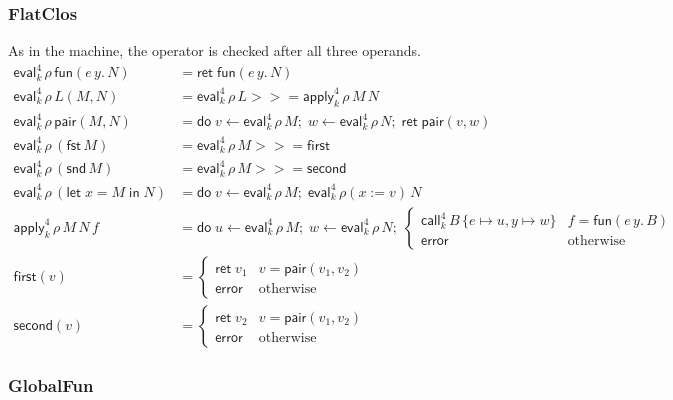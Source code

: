 \documentclass[10pt]{article}
\theoremstyle{acmplain}
\newcommand{\key}[1]{\mathsf{#1}}
\newcommand{\Let}{\key{let}\;}
\newcommand{\In}{\;\key{in}\;}
\newcommand{\fun}[1]{\key{fun}(#1)}
\newcommand{\pair}[2]{\key{pair}(#1, #2)}
\newcommand{\FST}{\key{fst}\,}
\newcommand{\SND}{\key{snd}\,}
\newcommand{\ext}[3]{#1(#2{:=}#3)}
\newcommand{\error}{\key{error}}
\newcommand{\pairV}[2]{\key{pair}(#1, #2)}
\newcommand{\funV}[1]{\key{fun}(#1)}
\newcommand{\Ret}{\key{ret}\;}
\newcommand{\bind}{\mathbin{>\!\!>\!\!=}}
\newcommand{\Do}{\key{do}\;}
\newcommand{\EV}[2]{\key{eval}^{#1}_{#2}}
\newcommand{\APP}[2]{\key{apply}^{#1}_{#2}}
\newcommand{\CALL}[2]{\key{call}^{#1}_{#2}}
\begin{document}
\subsubsection{FlatClos}

As in the machine, the operator is checked after all three operands.
\begin{align*}
  \EV{4}{k}\,\rho\,\fun{e\,y.\,N} &= \Ret \funV{e\, y.\, N} \\
  \EV{4}{k}\,\rho\,L(M, N) &= \EV{4}{k}\,\rho\,L \bind \APP{4}{k}\,\rho\,M\,N \\
  \EV{4}{k}\,\rho\,\pair{M}{N} &=
    \Do v \leftarrow \EV{4}{k}\,\rho\,M;\; w \leftarrow \EV{4}{k}\,\rho\,N;\; \Ret \pairV{v}{w} \\
  \EV{4}{k}\,\rho\,(\FST M) &= \EV{4}{k}\,\rho\,M \bind \key{first} \\
  \EV{4}{k}\,\rho\,(\SND M) &= \EV{4}{k}\,\rho\,M \bind \key{second} \\
  \EV{4}{k}\,\rho\,(\Let x = M \In N) &=
    \Do v \leftarrow \EV{4}{k}\,\rho\,M;\; \EV{4}{k}\,\ext{\rho}{x}{v}\,N \\[1ex]
  \APP{4}{k}\,\rho\,M\,N\,f &=
    \Do u \leftarrow \EV{4}{k}\,\rho\,M;\; w \leftarrow \EV{4}{k}\,\rho\,N;\;
    \begin{cases}
      \CALL{4}{k}\,B\,\{e {\mapsto} u, y {\mapsto} w\} & f = \funV{e\, y.\, B} \\
      \error & \text{otherwise}
    \end{cases} \\
  \key{first}(v) &=
    \begin{cases} \Ret v_1 & v = \pairV{v_1}{v_2} \\ \error & \text{otherwise} \end{cases} \\
  \key{second}(v) &=
    \begin{cases} \Ret v_2 & v = \pairV{v_1}{v_2} \\ \error & \text{otherwise} \end{cases}
\end{align*}

\subsubsection{GlobalFun}
\end{document}
